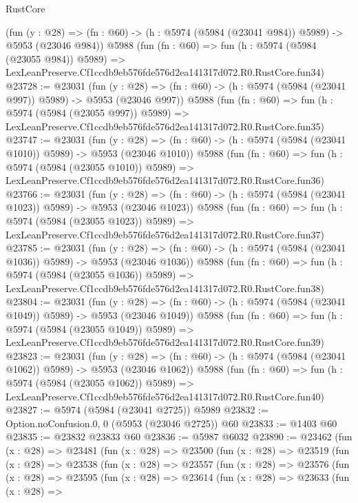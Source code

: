 \begin{lexlean}{RustCore}
\begin{coremodule}
    (fun (y : @28) => (fn : @60) -> (h : @5974 (@5984 (@23041 @984)) @5989) -> @5953 (@23046 @984))
    @5988
    (fun (fn : @60) =>
    fun (h : @5974 (@5984 (@23055 @984)) @5989) =>
    LexLeanPreserve.Cf1ccdb9eb576fde576d2ea141317d072.R0.RustCore.fun34)
@23728 := @23031
    (fun (y : @28) => (fn : @60) -> (h : @5974 (@5984 (@23041 @997)) @5989) -> @5953 (@23046 @997))
    @5988
    (fun (fn : @60) =>
    fun (h : @5974 (@5984 (@23055 @997)) @5989) =>
    LexLeanPreserve.Cf1ccdb9eb576fde576d2ea141317d072.R0.RustCore.fun35)
@23747 := @23031
    (fun (y : @28) =>
    (fn : @60) -> (h : @5974 (@5984 (@23041 @1010)) @5989) -> @5953 (@23046 @1010))
    @5988
    (fun (fn : @60) =>
    fun (h : @5974 (@5984 (@23055 @1010)) @5989) =>
    LexLeanPreserve.Cf1ccdb9eb576fde576d2ea141317d072.R0.RustCore.fun36)
@23766 := @23031
    (fun (y : @28) =>
    (fn : @60) -> (h : @5974 (@5984 (@23041 @1023)) @5989) -> @5953 (@23046 @1023))
    @5988
    (fun (fn : @60) =>
    fun (h : @5974 (@5984 (@23055 @1023)) @5989) =>
    LexLeanPreserve.Cf1ccdb9eb576fde576d2ea141317d072.R0.RustCore.fun37)
@23785 := @23031
    (fun (y : @28) =>
    (fn : @60) -> (h : @5974 (@5984 (@23041 @1036)) @5989) -> @5953 (@23046 @1036))
    @5988
    (fun (fn : @60) =>
    fun (h : @5974 (@5984 (@23055 @1036)) @5989) =>
    LexLeanPreserve.Cf1ccdb9eb576fde576d2ea141317d072.R0.RustCore.fun38)
@23804 := @23031
    (fun (y : @28) =>
    (fn : @60) -> (h : @5974 (@5984 (@23041 @1049)) @5989) -> @5953 (@23046 @1049))
    @5988
    (fun (fn : @60) =>
    fun (h : @5974 (@5984 (@23055 @1049)) @5989) =>
    LexLeanPreserve.Cf1ccdb9eb576fde576d2ea141317d072.R0.RustCore.fun39)
@23823 := @23031
    (fun (y : @28) =>
    (fn : @60) -> (h : @5974 (@5984 (@23041 @1062)) @5989) -> @5953 (@23046 @1062))
    @5988
    (fun (fn : @60) =>
    fun (h : @5974 (@5984 (@23055 @1062)) @5989) =>
    LexLeanPreserve.Cf1ccdb9eb576fde576d2ea141317d072.R0.RustCore.fun40)
@23827 := @5974 (@5984 (@23041 @2725)) @5989
@23832 := Option.noConfusion.{0, 0} (@5953 (@23046 @2725)) @60
@23833 := @1403 @60
@23835 := @23832 @23833 @60
@23836 := @5987 @6032
@23890 := @23462
    (fun (x : @28) =>
    @23481
      (fun (x : @28) =>
      @23500
        (fun (x : @28) =>
        @23519
          (fun (x : @28) =>
          @23538
            (fun (x : @28) =>
            @23557
              (fun (x : @28) =>
              @23576
                (fun (x : @28) =>
                @23595
                  (fun (x : @28) =>
                  @23614
                    (fun (x : @28) =>
                    @23633
                      (fun (x : @28) =>

\end{coremodule}
\end{lexlean}

